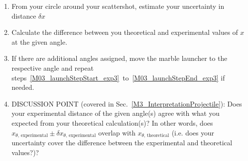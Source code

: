 \begin{enumerate}
\item From your circle around your scattershot, estimate your uncertainty in distance $\delta x$
\item \label{M03_launchStepEnd_exp3}  Calculate the difference between you theoretical and experimental values of $x$ at the given angle.
\item If there are additional angles assigned, move the marble launcher to the respective angle and repeat steps~\ref{M03_launchStepStart_exp3}~to~\ref{M03_launchStepEnd_exp3} if needed.
\item DISCUSSION POINT (covered in Sec.~\ref{M3_InterpretationProjectile}): Does your experimental distance of the given angle(s) agree with what you expected from your theoretical calculation(s)? In other words, does $x_{\theta\text{, experimental}} \pm \delta x_{\theta\text{, experimental}}$ overlap with $x_{\theta\text{, theoretical}}$ (i.e. does your uncertainty cover the difference between the experimental and theoretical values?)?




\end{enumerate}


















